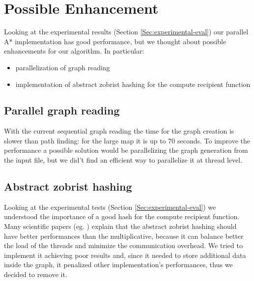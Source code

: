 \section{Possible Enhancement}
\label{Sec:enhancement}

Looking at the experimental results (Section \ref{Sec:experimental-eval}) our parallel A* implementation has good performance, 
but we thought about possible enhancements for our algorithm.
In particular:
\begin{itemize}
    \item parallelization of graph reading
    \item implementation of abstract zobrist hashing for the compute recipient function
\end{itemize}

\subsection{Parallel graph reading}

With the current sequential graph reading the time for the graph creation is slower than path finding: for the large map it is up to 70 seconds.
To improve the performance a possible solution would be parallelizing the graph generation from the input file,
but we did't find an efficient way to parallelize it at thread level.


\subsection{Abstract zobrist hashing}

Looking at the experimental tests (Section \ref{Sec:experimental-eval}) we understood the importance of a good hash for the compute recipient function.
Many scientific papers (eg. \cite{bibParAstar}) explain that the abstract zobrist hashing should have better performances than the multiplicative,
because it can balance better the load of the threads and minimize the communication overhead.
We tried to implement it achieving poor results and, since it needed to store additional data inside the graph, it penalized 
other implementation's performances, thus we decided to remove it.




